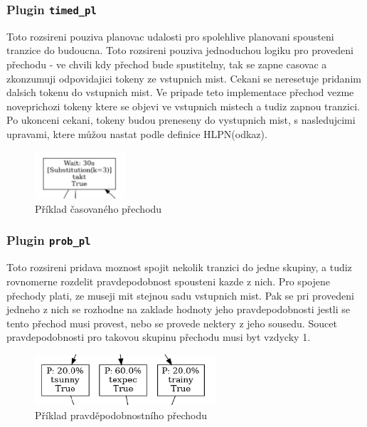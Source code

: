 \subsubsection{Plugin \texttt{timed\_pl}}
\label{subsec:timed_pl}
Toto rozsireni pouziva planovac udalosti pro spolehlive planovani spousteni tranzice do budoucna. Toto rozsireni pouziva jednoduchou logiku pro provedeni přechodu - ve chvili kdy přechod bude spustitelny, tak se zapne casovac a zkonzumuji odpovidajici tokeny ze vstupnich mist. Cekani se neresetuje pridanim dalsich tokenu do vstupnich mist. Ve pripade teto implementace přechod vezme noveprichozi tokeny ktere se objevi ve vstupnich mistech a tudiz zapnou tranzici. Po ukonceni cekani, tokeny budou preneseny do vystupnich mist, s nasledujcimi upravami, ktere můžou nastat podle definice HLPN(odkaz).
\begin{figure}[hbt]
  \centering
  \includegraphics[width=0.3\textwidth]{obrazky-figures/timed-transition.png}
  \caption{Příklad časovaného přechodu}
  \label{timed-transition}
\end{figure}

\subsubsection{Plugin \texttt{prob\_pl}}
\label{subsec:prob_pl}
Toto rozsireni pridava moznost spojit nekolik tranzici do jedne skupiny, a tudiz rovnomerne rozdelit pravdepodobnost spousteni kazde z nich. Pro spojene přechody plati, ze museji mit stejnou sadu vstupnich mist. Pak se pri provedeni jedneho z nich se rozhodne na zaklade hodnoty jeho pravdepodobnosti jestli se tento přechod musi provest, nebo se provede nektery z jeho sousedu. Soucet pravdepodobnosti pro takovou skupinu přechodu musi byt vzdycky 1.
\begin{figure}[hbt]
  \centering
  \includegraphics[width=0.6\textwidth]{obrazky-figures/prob-transition.png}
  \caption{Příklad pravděpodobnostního přechodu}
  \label{prob-transition}
\end{figure}

